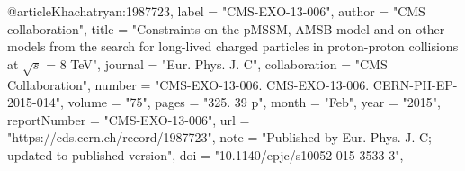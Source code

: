 @article{Khachatryan:1987723,
      label          = "CMS-EXO-13-006",
      author        = "{CMS collaboration}",
      title         = "{Constraints on the pMSSM, AMSB model and on other models
                       from the search for long-lived charged particles in
                       proton-proton collisions at $\sqrt{s}$ = 8 TeV}",
      journal       = "Eur. Phys. J. C",
      collaboration = "CMS Collaboration",
      number        = "CMS-EXO-13-006. CMS-EXO-13-006. CERN-PH-EP-2015-014",
      volume        = "75",
      pages         = "325. 39 p",
      month         = "Feb",
      year          = "2015",
      reportNumber  = "CMS-EXO-13-006",
      url           = "https://cds.cern.ch/record/1987723",
      note          = "Published by Eur. Phys. J. C; updated to published
                       version",
      doi           = "10.1140/epjc/s10052-015-3533-3",
}

